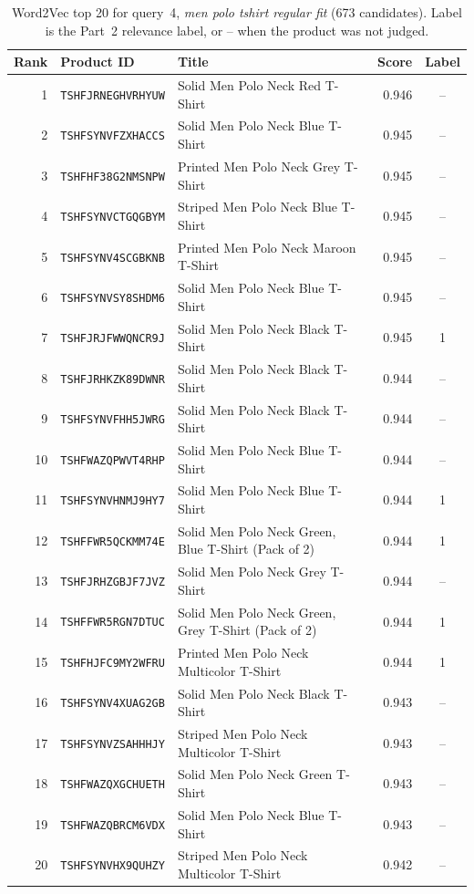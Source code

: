 \documentclass[11pt,a4paper]{article}
\begin{document}
\begin{table}[htbp]
  \centering
  \small
  \caption{Word2Vec top 20 for query~4, \emph{men polo tshirt regular fit} (673 candidates). Label is
  the Part~2 relevance label, or -- when the product was not judged.}
  \label{tab:w2v-q4}
  \begin{tabular}{rlp{7.2cm}rc}
    \toprule
    Rank & Product ID & Title & Score & Label \\
    \midrule
    1 & \texttt{TSHFJRNEGHVRHYUW} & Solid Men Polo Neck Red T-Shirt & 0.946 & -- \\
    2 & \texttt{TSHFSYNVFZXHACCS} & Solid Men Polo Neck Blue T-Shirt & 0.945 & -- \\
    3 & \texttt{TSHFHF38G2NMSNPW} & Printed Men Polo Neck Grey T-Shirt & 0.945 & -- \\
    4 & \texttt{TSHFSYNVCTGQGBYM} & Striped Men Polo Neck Blue T-Shirt & 0.945 & -- \\
    5 & \texttt{TSHFSYNV4SCGBKNB} & Printed Men Polo Neck Maroon T-Shirt & 0.945 & -- \\
    6 & \texttt{TSHFSYNVSY8SHDM6} & Solid Men Polo Neck Blue T-Shirt & 0.945 & -- \\
    7 & \texttt{TSHFJRJFWWQNCR9J} & Solid Men Polo Neck Black T-Shirt & 0.945 & 1 \\
    8 & \texttt{TSHFJRHKZK89DWNR} & Solid Men Polo Neck Black T-Shirt & 0.944 & -- \\
    9 & \texttt{TSHFSYNVFHH5JWRG} & Solid Men Polo Neck Black T-Shirt & 0.944 & -- \\
    10 & \texttt{TSHFWAZQPWVT4RHP} & Solid Men Polo Neck Blue T-Shirt & 0.944 & -- \\
    11 & \texttt{TSHFSYNVHNMJ9HY7} & Solid Men Polo Neck Blue T-Shirt & 0.944 & 1 \\
    12 & \texttt{TSHFFWR5QCKMM74E} & Solid Men Polo Neck Green, Blue T-Shirt (Pack of 2) & 0.944 & 1 \\
    13 & \texttt{TSHFJRHZGBJF7JVZ} & Solid Men Polo Neck Grey T-Shirt & 0.944 & -- \\
    14 & \texttt{TSHFFWR5RGN7DTUC} & Solid Men Polo Neck Green, Grey T-Shirt (Pack of 2) & 0.944 & 1 \\
    15 & \texttt{TSHFHJFC9MY2WFRU} & Printed Men Polo Neck Multicolor T-Shirt & 0.944 & 1 \\
    16 & \texttt{TSHFSYNV4XUAG2GB} & Solid Men Polo Neck Black T-Shirt & 0.943 & -- \\
    17 & \texttt{TSHFSYNVZSAHHHJY} & Striped Men Polo Neck Multicolor T-Shirt & 0.943 & -- \\
    18 & \texttt{TSHFWAZQXGCHUETH} & Solid Men Polo Neck Green T-Shirt & 0.943 & -- \\
    19 & \texttt{TSHFWAZQBRCM6VDX} & Solid Men Polo Neck Blue T-Shirt & 0.943 & -- \\
    20 & \texttt{TSHFSYNVHX9QUHZY} & Striped Men Polo Neck Multicolor T-Shirt & 0.942 & -- \\
    \bottomrule
  \end{tabular}
\end{table}
\end{document}
